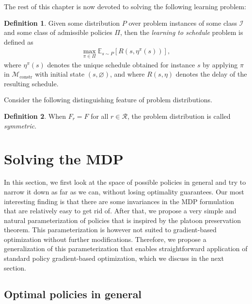 \documentclass[a4paper]{report}
\theoremstyle{definition}
\newtheorem{define}{Definition}[chapter]
\theoremstyle{plain}
\begin{document}
The rest of this chapter is now devoted to solving the following learning
problem:

\begin{mdframed}[%
  innertopmargin=0.3em,
  innerbottommargin=0.9em,
  skipabove=1.5em,
  skipbelow=4em,
]
  \begin{define}
    Given some distribution $P$ over problem instances of some class
    $\mathcal{I}$ and some class of admissible policies $\Pi$, then the
    \emph{learning to schedule} problem is defined as
    \begin{align}
      \tag{MDP}
      \max_{\pi \in \Pi} \mathbb{E}_{s \sim P} [R(s, \eta^\pi(s))] ,
    \end{align}
    where $\eta^\pi(s)$ denotes the unique schedule obtained for instance $s$ by
    applying $\pi$ in $\mathcal{M}_\mathrm{constr}$ with initial state
    $(s, \varnothing)$, and where $R(s, \eta)$ denotes the delay of the
    resulting schedule.
  \end{define}
\end{mdframed}

Consider the following distinguishing feature of problem distributions.
\begin{define}
  When $F_r = F$ for all $r \in \mathcal{R}$, the problem distribution is called \emph{symmetric}.
\end{define}



\clearpage

\section{Solving the MDP}

In this section, we first look at the space of possible policies in general
and try to narrow it down as far as we can, without losing optimality
guarantees.
%
Our most interesting finding is that there are some invariances in the MDP
formulation that are relatively easy to get rid of.
%
After that, we propose a very simple and natural parameterization of policies
that is inspired by the platoon preservation theorem. This parameterization is
however not suited to gradient-based optimization without further modifications.
Therefore, we propose a generalization of this parameterization that enables
straightforward application of standard policy gradient-based optimization,
which we discuss in the next section.

\subsection{Optimal policies in general}
\end{document}
